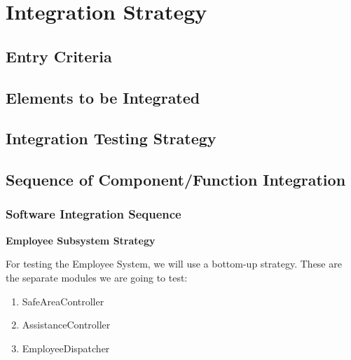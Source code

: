\documentclass{article}
\begin{document}
\section{Integration Strategy}

\subsection{Entry Criteria}


\subsection{Elements to be Integrated}


\subsection{Integration Testing Strategy}


\subsection{Sequence of Component/Function Integration}

\subsubsection{Software Integration Sequence}

\begin{large}
\textbf{Employee Subsystem Strategy}
\end{large}

For testing the Employee System, we will use a bottom-up strategy. These are the separate modules we are going to test: 
\begin{enumerate}
\item SafeAreaController
\item AssistanceController
\item EmployeeDispatcher
\end{enumerate}
\end{document}
